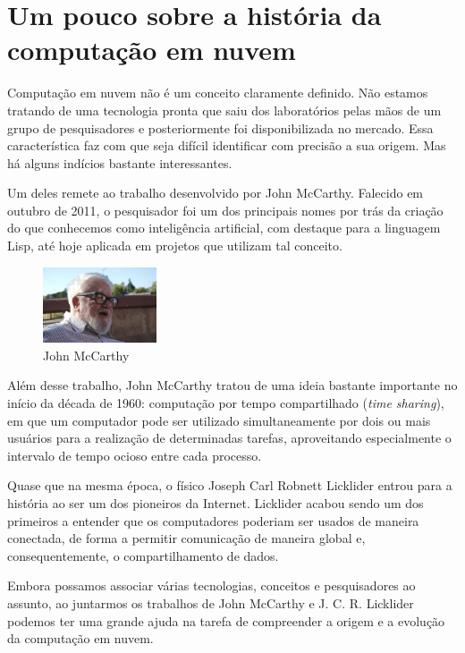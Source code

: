 \chapter{Um pouco sobre a história da computação em nuvem}

Computação em nuvem não é um conceito claramente definido. Não estamos tratando de
uma tecnologia pronta que saiu dos laboratórios pelas mãos de um grupo de
pesquisadores e posteriormente foi disponibilizada no mercado. Essa característica
faz com que seja difícil identificar com precisão a sua origem. Mas há alguns
indícios bastante interessantes.

Um deles remete ao trabalho desenvolvido por John McCarthy. Falecido em outubro de
2011, o pesquisador foi um dos principais nomes por trás da criação do que
conhecemos como inteligência artificial, com destaque para a linguagem Lisp, até
hoje aplicada em projetos que utilizam tal conceito.

\begin{figure}[ht]
    \centering
    \includegraphics[width=0.3\textwidth]{img/mccarthy.jpg}
    \caption{John McCarthy}
    \label{fig:mccarthy}
\end{figure}

Além desse trabalho, John McCarthy tratou de uma ideia bastante importante no início
da década de 1960: computação por tempo compartilhado (\emph{time sharing}), em que um
computador pode ser utilizado simultaneamente por dois ou mais usuários para a
realização de determinadas tarefas, aproveitando especialmente o intervalo de tempo
ocioso entre cada processo.

Quase que na mesma época, o físico Joseph Carl Robnett Licklider entrou para a
história ao ser um dos pioneiros da Internet. Licklider acabou sendo um dos
primeiros a entender que os computadores poderiam ser usados de maneira conectada,
de forma a permitir comunicação de maneira global e, consequentemente, o
compartilhamento de dados. 

Embora possamos associar várias tecnologias, conceitos e pesquisadores ao assunto,
ao juntarmos os trabalhos de John McCarthy e J. C. R. Licklider podemos ter uma
grande ajuda na tarefa de compreender a origem e a evolução da computação em nuvem.

